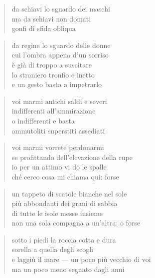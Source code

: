 \clearpage


\begin{verse}
    da schiavi lo sguardo dei maschi\\
    ma da schiavi non domati\\
    gonfi di sfida obliqua
\end{verse}

\begin{verse}
    da regine lo sguardo delle donne\\
    cui l'ombra appena d'un sorriso\\
    è già di troppo a suscitare\\
    lo straniero tronfio e inetto\\
    e un gesto basta a impetrarlo
\end{verse}

\clearpage


\begin{verse}
    voi marmi antichi saldi e severi\\
    indifferenti all'ammirazione\\
    o indifferenti e basta\\
    ammutoliti superstiti assediati
\end{verse}

\begin{verse}
    voi marmi vorrete perdonarmi\\
    se profittando dell'elevazione della rupe\\
    io per un attimo vi do le spalle\\
    ché cerco cosa mi chiama qui: forse
\end{verse}

\begin{verse}
    un tappeto di scatole bianche nel sole\\
    più abbondanti dei grani di sabbia\\
    di tutte le isole messe insieme\\
    non una sola compagna a un'altra: o forse
\end{verse}

\begin{verse}
    sotto i piedi la roccia cotta e dura\\
    sorella a quella degli scogli\\
    e laggiù il mare — un poco più vecchio di voi\\
    ma un poco meno segnato dagli anni
\end{verse}

